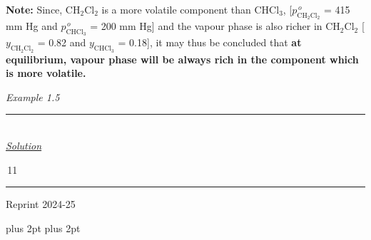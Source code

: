 \documentclass[11pt,a4paper]{article}
\renewcommand{\normalsize}{\fontsize{10.5bp}{12.7bp}\selectfont\abovedisplayskip=4pt plus 2pt\belowdisplayskip=4pt plus 2pt\abovedisplayshortskip=2pt\belowdisplayshortskip=2pt}
\begin{document}
\begin{tcolorbox}
\begin{minipage}[t]{0.78\linewidth}
\vspace{6pt}
\textbf{Note:} Since, CH$_2$Cl$_2$ is a more volatile component than CHCl$_3$, [$p^{\,o}_{\text{CH}_2\text{Cl}_2}$ = 415 mm Hg and $p^{\,o}_{\text{CHCl}_3}$ = 200 mm Hg] and the vapour phase is also richer in CH$_2$Cl$_2$ [$y_{\text{CH}_2\text{Cl}_2}$ = 0.82 and $y_{\text{CHCl}_3}$ = 0.18], it may thus be concluded that \textbf{at equilibrium, vapour phase will be always rich in the component which is more volatile.}
\end{minipage}\hfill
\begin{minipage}[t]{0.19\linewidth}
{\color{DeepSkyBlue3}\large\itshape Example 1.5}\\[-3pt]
{\color{DeepSkyBlue3}\rule{\linewidth}{0.8pt}}\\[60pt]
\mbox{}\hfill{\color{DeepSkyBlue3}\large\itshape\underline{Solution}}
\end{minipage}
\end{tcolorbox}

\vfill
\noindent\hfill\begin{minipage}{0.33\textwidth}
\colorbox{Goldenrod1}{\color{gray}\,11\,}\\[-6pt]
{\color{Goldenrod1}\rule{\linewidth}{1pt}}
\end{minipage}
\begin{center}
{\sffamily\small Reprint 2024-25}
\end{center}

\normalsize

\end{document}
